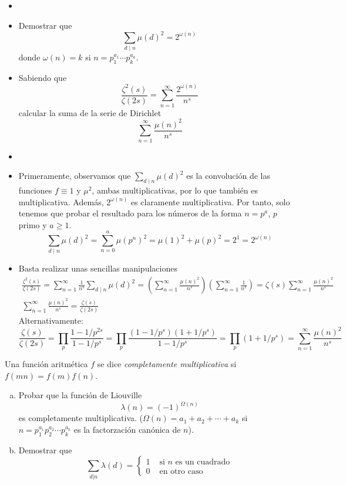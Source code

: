 \documentclass[twoside]{article}
\begin{document}
\begin{ejercicio}{5}
\begin{itemize}
\item[]
\item Demostrar que 
\[
\sum_{d\mid n} \mu(d)^2 = 2^{\omega(n)}
\]
donde $\omega(n)=k$ si $n=p_1^{a_1}\cdots p_k^{a_k}$.
\item Sabiendo que
\[
\frac{\zeta^2(s)}{\zeta(2s)}=\sum_{n=1}^\infty \frac{2^{\omega(n)}}{n^s}
\]
calcular la suma de la serie de Dirichlet
$$
\sum_{n=1}^\infty \frac{\mu(n)^2}{n^s}
$$
\end{itemize}
\begin{sol}
\begin{itemize}
\item[]
\item Primeramente, observamos que $\sum_{d\mid n} \mu(d)^2$ es la convolución de las funciones $f\equiv 1$ y $\mu^2$, ambas multiplicativas, por lo que también es multiplicativa. Además, $2^{\omega(n)}$ es claramente multiplicativa. Por tanto, solo tenemos que probar el resultado para los números de la forma $n=p^a$, $p$ primo y $a\geq 1$.
\[
\sum_{d\mid n} \mu(d)^2 = \sum_{n=0}^a \mu(p^n)^2 = \mu(1)^2 + \mu(p)^2 = 2^1 = 2^{\omega(n)}
\]
\item Basta realizar unas sencillas manipulaciones
\begin{gather*}
\frac{\zeta^2(s)}{\zeta(2s)}=\sum_{n=1}^\infty \frac{1}{n^s}\sum_{d\mid n} \mu(d)^2 = \left(\sum_{n=1}^\infty \frac{\mu(n)^2}{n^s}\right)\left(\sum_{n=1}^\infty \frac{1}{n^s}\right) = \zeta(s)\sum_{n=1}^\infty \frac{\mu(n)^2}{n^s}\\
\sum_{n=1}^\infty \frac{\mu(n)^2}{n^s} = \frac{\zeta(s)}{\zeta(2s)}
\end{gather*}
Alternativamente:
\[ \frac{ζ(s)}{ζ(2s)} = \prod_p \frac{1-1/p^{2s}}{1-1/p^s} = \prod_p \frac{(1-1/p^s)(1+1/p^s)}{1-1/p^s} = \prod_p (1+1/p^s) = \sum_{n=1}^{∞} \frac{μ(n)^2}{n^s} \]
\end{itemize}
\end{sol}
\end{ejercicio}
\newpage

\begin{ejercicio}{6}
Una función aritmética $f$ se dice \textit{completamente multiplicativa} si $f(mn)=f(m)f(n)$.
\begin{enumerate}[(a)]
\item Probar que la función de Liouville
	\[ λ(n) = (-1)^{Ω(n)} \]
	es completamente multiplicativa. ($Ω(n) = a_1+a_2+\cdots+a_k$ si $n=p_1^{a_1}p_2^{a_2}\cdots p_k^{a_k}$ es la factorzación canónica de $n$).
\item Demostrar que
	\[ \sum_{d|n} λ(d) = \begin{cases}
		1 &\text{ si }n\text{ es un cuadrado}\\
		0 &\text{ en otro caso}
	\end{cases}\]
\end{enumerate}
\end{ejercicio}
\begin{solucion}
\end{solucion}
\newpage
\end{document}
